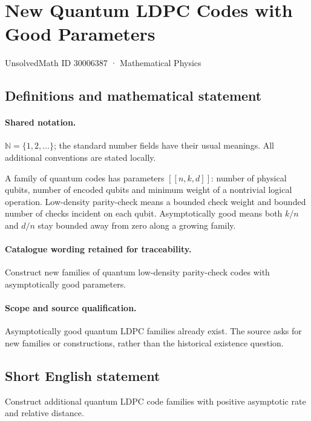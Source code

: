\documentclass[11pt]{article}
\begin{document}
\setcounter{section}{30006386}
\section{New Quantum LDPC Codes with Good Parameters}\label{30006387}
{\small UnsolvedMath ID 30006387 · Mathematical Physics}
\subsection{Definitions and mathematical statement}

\paragraph{Shared notation.}$\mathbb N=\{1,2,\ldots\}$; the standard number fields have their usual meanings. All additional conventions are stated locally.


A family of quantum codes has parameters $[[n,k,d]]$: number of physical qubits, number of encoded qubits and minimum weight of a nontrivial logical operation. Low-density parity-check means a bounded check weight and bounded number of checks incident on each qubit. Asymptotically good means both $k/n$ and $d/n$ stay bounded away from zero along a growing family.

\paragraph{Catalogue wording retained for traceability.}
Construct new families of quantum low-density parity-check codes with asymptotically good parameters.

\paragraph{Scope and source qualification.}Asymptotically good quantum LDPC families already exist. The source asks for new families or constructions, rather than the historical existence question.
\subsection{Short English statement}
Construct additional quantum LDPC code families with positive asymptotic rate and relative distance.
\end{document}

